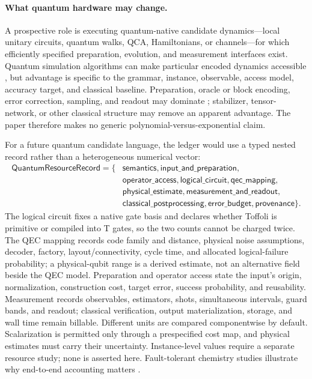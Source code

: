 \documentclass[10pt]{article}
\theoremstyle{definition}
\begin{document}
\paragraph{What quantum hardware may change.}
A prospective role is executing quantum-native candidate dynamics---local
unitary circuits, quantum walks, QCA, Hamiltonians, or channels---for which efficiently specified
preparation, evolution, and measurement interfaces exist. Quantum simulation algorithms can make
particular encoded dynamics accessible \citep{lloyd1996,lowchuang2019}, but advantage is specific
to the grammar, instance, observable, access model, accuracy target, and classical baseline.
Preparation, oracle or block encoding, error correction, sampling, and readout may dominate
\citep{pleschbrukner2011,fowler2012surface,gidneyekera2021};
stabilizer, tensor-network, or other classical structure may remove an apparent advantage. The
paper therefore makes no generic polynomial-versus-exponential claim.

For a future quantum candidate language, the ledger would use a typed nested record rather than a
heterogeneous numerical vector:
\[
\begin{aligned}
\mathsf{QuantumResourceRecord}=\{&
\mathsf{semantics},\mathsf{input\_and\_preparation},\\
&\mathsf{operator\_access},\mathsf{logical\_circuit},\mathsf{qec\_mapping},\\
&\mathsf{physical\_estimate},\mathsf{measurement\_and\_readout},\\
&\mathsf{classical\_postprocessing},\mathsf{error\_budget},\mathsf{provenance}\}.
\end{aligned}
\]
The logical circuit fixes a native gate basis and declares whether Toffoli is primitive or
compiled into T gates, so the two counts cannot be charged twice. The QEC mapping records code
family and distance, physical noise assumptions, decoder, factory, layout/connectivity, cycle
time, and allocated logical-failure probability; a physical-qubit range is a derived estimate,
not an alternative field beside the QEC model. Preparation and operator access state the input's
origin, normalization, construction cost, target error, success probability, and reusability.
Measurement records observables, estimators, shots, simultaneous intervals, guard bands, and
readout; classical verification, output materialization, storage, and wall time remain billable.
Different units are compared componentwise by default. Scalarization is permitted only through a
prespecified cost map, and physical estimates must carry their uncertainty. Instance-level values
require a separate resource study; none is asserted here. Fault-tolerant chemistry studies
illustrate why end-to-end accounting matters \citep{reiher2017}.
\end{document}
